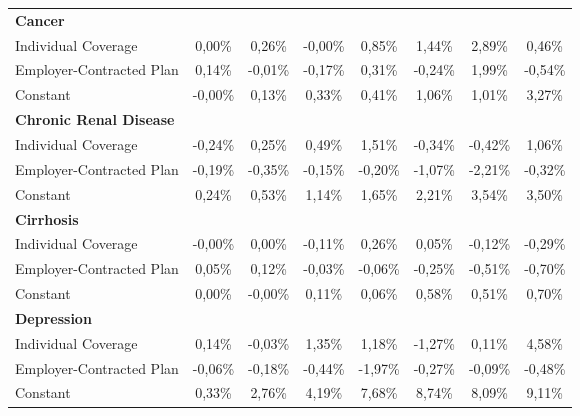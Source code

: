 \documentclass{article}
\begin{document}
\begin{table*}
{\begin{tabular}{l*{7}{c}}
\midrule
\textbf{Cancer} & & & & & & & \\

Individual Coverage &   0,00\%  &   0,26\%  &  -0,00\%  &   0,85\%  &   1,44\%  &    \cellcolor[gray]{0.9} 2,89\%\sym{*}  &   0,46\% \\
Employer-Contracted Plan&   0,14\%  &  -0,01\%  &  -0,17\%  &   0,31\%  &  -0,24\%  &   1,99\%  &  -0,54\% \\
Constant            &  -0,00\%  &   0,13\%\sym{*}  &   0,33\%\sym{*}  &   0,41\%\sym{**} &   1,06\%\sym{***}&   1,01\%\sym{*}  &   3,27\%\sym{***}\\

\midrule
\textbf{Chronic Renal Disease} & & & & & & & \\

Individual Coverage &  -0,24\%\sym{**} &   0,25\%  &   0,49\%  &   1,51\%  &  -0,34\%  &  -0,42\%  &   1,06\% \\
Employer-Contracted Plan&  -0,19\%\sym{*}  &  -0,35\%  &  -0,15\%  &  -0,20\%  &  -1,07\%  &  -2,21\%\sym{*}  &  -0,32\% \\
Constant            &   0,24\%\sym{**} &   0,53\%\sym{***}&   1,14\%\sym{***}&   1,65\%\sym{***}&   2,21\%\sym{***}&   3,54\%\sym{***}&   3,50\%\sym{***}\\

\midrule
\textbf{Cirrhosis} & & & & & & & \\

Individual Coverage &  -0,00\%  &   0,00\%  &  -0,11\%  &   0,26\%  &   0,05\%  &  -0,12\%  &  -0,29\% \\
Employer-Contracted Plan&   0,05\%  &   0,12\%  &  -0,03\%  &  -0,06\%  &  -0,25\%  &  -0,51\%  &  -0,70\% \\
Constant            &   0,00\%  &  -0,00\%  &   0,11\%  &   0,06\%  &   0,58\%\sym{*}  &   0,51\%  &   0,70\% \\


\midrule
\textbf{Depression} & & & & & & & \\

Individual Coverage &   0,14\%  &  -0,03\%  &   1,35\%  &   1,18\%  &  -1,27\%  &   0,11\%  &   4,58\% \\
Employer-Contracted Plan&  -0,06\%  &  -0,18\%  &  -0,44\%  &  -1,97\%\sym{*}  &  -0,27\%  &  -0,09\%  &  -0,48\% \\
Constant            &   0,33\%\sym{***}&   2,76\%\sym{***}&   4,19\%\sym{***}&   7,68\%\sym{***}&   8,74\%\sym{***}&   8,09\%\sym{***}&   9,11\%\sym{***}\\


\end{tabular}}
\end{table*}
\end{document}

